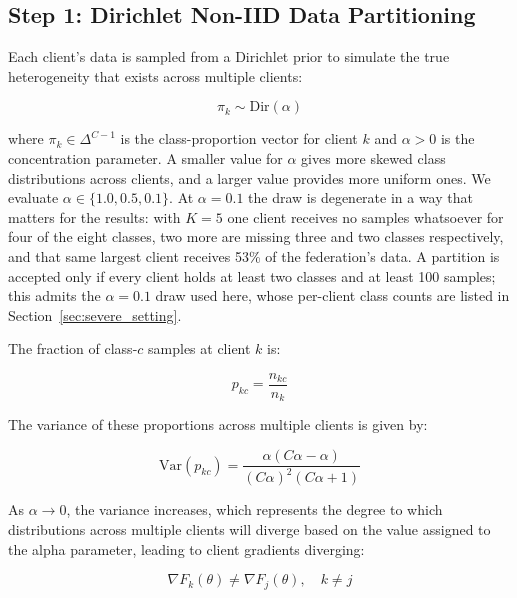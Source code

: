 \documentclass{ieeeaccess}
\begin{document}
\subsection{Step 1: Dirichlet Non-IID Data Partitioning}

Each client's data is sampled from a Dirichlet prior to simulate the true heterogeneity that exists across multiple clients:

\begin{equation}
\label{eq:dirichlet}
\pi_k \sim \text{Dir}(\alpha)
\end{equation}

where $\pi_k \in \Delta^{C-1}$ is the class-proportion vector for client $k$ and $\alpha > 0$ is the concentration parameter. A smaller value for $\alpha$ gives more skewed class distributions across clients, and a larger value provides more uniform ones. We evaluate $\alpha \in \{1.0, 0.5, 0.1\}$. At $\alpha = 0.1$ the draw is degenerate in a way that matters for the results: with $K = 5$ one client receives no samples whatsoever for four of the eight classes, two more are missing three and two classes respectively, and that same largest client receives 53\% of the federation's data. A partition is accepted only if every client holds at least two classes and at least 100 samples; this admits the $\alpha = 0.1$ draw used here, whose per-client class counts are listed in Section~\ref{sec:severe_setting}.

The fraction of class-$c$ samples at client $k$ is:

\begin{equation}
\label{eq:class_proportion}
p_{kc} = \frac{n_{kc}}{n_k}
\end{equation}

The variance of these proportions across multiple clients is given by:

\begin{equation}
\label{eq:dirichlet_variance}
\text{Var}(p_{kc}) =
\frac{\alpha (C\alpha - \alpha)}
{(C\alpha)^2 (C\alpha + 1)}
\end{equation}

As $\alpha \to 0$, the variance increases, which represents the degree to which distributions across multiple clients will diverge based on the value assigned to the alpha parameter, leading to client gradients diverging:

\begin{equation}
\label{eq:gradient_divergence}
\nabla F_k(\theta) \neq \nabla F_j(\theta), \quad k \neq j
\end{equation}
\end{document}
